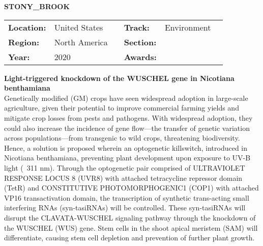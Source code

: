 \textbf{\uppercase{Stony\_Brook}}
\FloatBarrier
\begin{table}[h]
\begin{tabular}{lp{2.5cm}llll}
\textbf{Location:} & United States & \multicolumn{1}{|l}{} & \textbf{Track:}   & Environment \\
\textbf{Region:}   & North America   & \multicolumn{1}{|l}{} & \textbf{Section:} &  \\
\textbf{Year:}     & 2020   & \multicolumn{1}{|l}{} & \textbf{Awards:}  &
\end{tabular}
\end{table}
\FloatBarrier
\noindent	\textbf{Light-triggered knockdown of the WUSCHEL gene in Nicotiana benthamiana} \vspace{.2cm}\\
Genetically modified (GM) crops have seen widespread adoption in large-scale agriculture, given their potential to improve commercial farming yields and mitigate crop losses from pests and pathogens. With widespread adoption, they could also increase the incidence of gene flow—the transfer of genetic variation across populations—from transgenic to wild crops, threatening biodiversity. Hence, a solution is proposed wherein an optogenetic killswitch, introduced in Nicotiana benthamiana, preventing plant development upon exposure to UV-B light (~311 nm). Through the optogenetic pair comprised of ULTRAVIOLET RESPONSE LOCUS 8 (UVR8) with attached tetracycline repressor domain (TetR) and CONSTITUTIVE PHOTOMORPHOGENIC1 (COP1) with attached VP16 transactivation domain, the transcription of synthetic trans-acting small interfering RNAs (syn-tasiRNAs) will be controlled. These syn-tasiRNAs will disrupt the CLAVATA-WUSCHEL signaling pathway through the knockdown of the WUSCHEL (WUS) gene. Stem cells in the shoot apical meristem (SAM) will differentiate, causing stem cell depletion and prevention of further plant growth.

